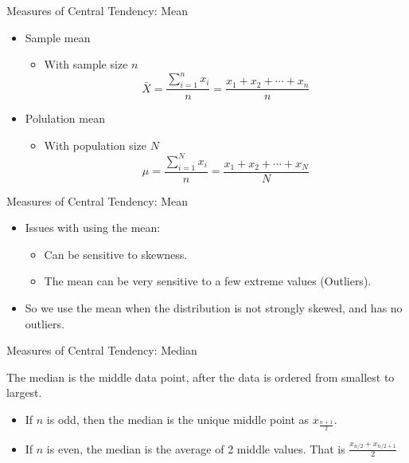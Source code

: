 \documentclass[ignorenonframetext,]{beamer}
\providecommand{\tightlist}{%
  \setlength{\itemsep}{0pt}\setlength{\parskip}{0pt}}
\begin{document}
\begin{frame}{Measures of Central Tendency: Mean}

\begin{itemize}
\item
  Sample mean

  \begin{itemize}
  \tightlist
  \item
    With sample size \(n\)
    \[\bar{X}=\frac{\sum^n_{i=1}x_i}{n}=\frac{x_1+x_2+\cdots+x_n}{n}\]
  \end{itemize}
\item
  Polulation mean

  \begin{itemize}
  \tightlist
  \item
    With population size \(N\)
    \[\mu=\frac{\sum^N_{i=1}x_i}{n}=\frac{x_1+x_2+\cdots+x_N}{N}\]
  \end{itemize}
\end{itemize}

\end{frame}

\begin{frame}{Measures of Central Tendency: Mean}

\begin{itemize}
\item
  Issues with using the mean:

  \begin{itemize}
  \item
    Can be sensitive to skewness.
  \item
    The mean can be very sensitive to a few extreme values (Outliers).
  \end{itemize}
\item
  So we use the mean when the distribution is not strongly skewed, and
  has no outliers.
\end{itemize}

\end{frame}

\begin{frame}{Measures of Central Tendency: Median}

The median is the middle data point, after the data is ordered from
smallest to largest.

\begin{itemize}
\item
  If \(n\) is odd, then the median is the unique middle point as
  \(x_{\frac{n+1}{2}}\).
\item
  If \(n\) is even, the median is the average of 2 middle values. That
  is \(\frac{x_{n/2}+x_{n/2+1}}{2}\)
\end{itemize}

\end{frame}
\end{document}
